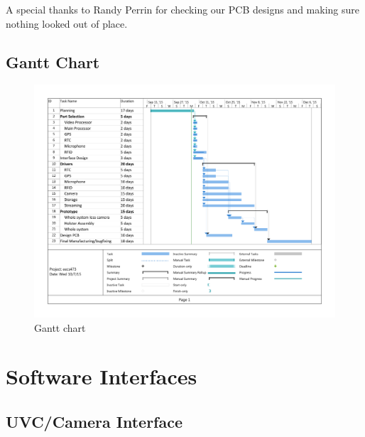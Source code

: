 \documentclass[12pt]{article}
\begin{document}
A special thanks to Randy Perrin for checking our PCB designs and making sure
nothing looked out of place.

\newpage




\newpage

\appendix

\begin{landscape}
    \section{Gantt Chart}
    \label{app:gantt}
    \thispagestyle{empty}

    \begin{figure}[h!]
        \centering
        \includegraphics[width=1.1\textwidth]{gantt}
        \caption{Gantt chart}
        \label{fig:gantt}
    \end{figure}
\end{landscape}

\newpage

\section{Software Interfaces}
\label{app:software_interfaces}

\subsection{UVC/Camera Interface}


\newpage
\end{document}
